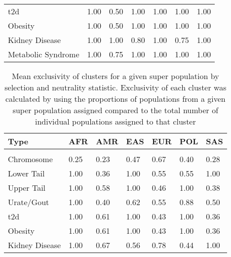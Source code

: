 \documentclass[twoside,openright]{report}
\begin{document}
\begin{table}
\begin{tabular}[t]{lllllll}
\hspace{1em}\Gls{t2d} & 1.00 & 0.50 & 1.00 & 1.00 & 1.00 & 1.00\\
\hspace{1em}Obesity & 1.00 & 0.50 & 1.00 & 1.00 & 1.00 & 1.00\\
\hspace{1em}Kidney Disease & 1.00 & 1.00 & 0.80 & 1.00 & 0.75 & 1.00\\
\hspace{1em}Metabolic Syndrome & 1.00 & 0.75 & 1.00 & 1.00 & 1.00 & 1.00\\
\bottomrule
\end{tabular}
\end{table}

\begin{table}

\caption[Mean exclusivity of clusters for a given super population by selection and neutrality statistic.]{\label{tab:exclusivity}\label{tab:exclusivity} Mean exclusivity of clusters for a given super population by selection and neutrality statistic. Exclusivity of each cluster was calculated by using the proportions of populations from a given super population assigned compared to the total number of individual populations assigned to that cluster}
\centering
\begin{tabular}[t]{lllllll}
\toprule
Type & AFR & AMR & EAS & EUR & POL & SAS\\
\midrule
\addlinespace[0.3em]
\multicolumn{7}{l}{\textbf{Fu and Li's F}}\\
\hspace{1em}Chromosome & 0.25 & 0.23 & 0.47 & 0.67 & 0.40 & 0.28\\
\hspace{1em}Lower Tail & 1.00 & 0.36 & 1.00 & 0.55 & 0.55 & 1.00\\
\hspace{1em}Upper Tail & 1.00 & 0.58 & 1.00 & 0.46 & 1.00 & 0.38\\
\hspace{1em}Urate/Gout & 1.00 & 0.40 & 0.62 & 0.55 & 0.88 & 0.50\\
\hspace{1em}\Gls{t2d} & 1.00 & 0.61 & 1.00 & 0.43 & 1.00 & 0.36\\
\hspace{1em}Obesity & 1.00 & 0.61 & 1.00 & 0.43 & 1.00 & 0.36\\
\hspace{1em}Kidney Disease & 1.00 & 0.67 & 0.56 & 0.78 & 0.44 & 1.00\\

\end{tabular}
\end{table}
\end{document}
